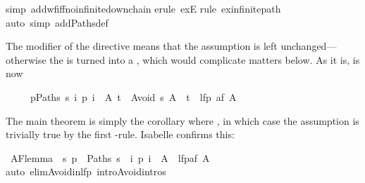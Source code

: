 \begin{isabellebody}
simp\ add{\isacharcolon}wf{\isacharunderscore}iff{\isacharunderscore}no{\isacharunderscore}infinite{\isacharunderscore}down{\isacharunderscore}chain{\isacharparenright}\isanewline
{}erule\ exE{\isacharparenright}\isanewline
{}rule\ ex{\isacharunderscore}infinite{\isacharunderscore}path{\isacharparenright}\isanewline
{}auto\ simp\ add{\isacharcolon}Paths{\isacharunderscore}def{\isacharparenright}\isanewline
{}%
\begin{isamarkuptext}%
The  modifier of the  directive means
that the assumption is left unchanged---otherwise the  is turned
into a , which would complicate matters below. As it is,
 is now
\begin{isabelle}%
\ \ \ \ \ {\isasymlbrakk}{\isasymforall}p{\isasymin}Paths\ s{\isachardot}\ {\isasymexists}i{\isachardot}\ p\ i\ {\isasymin}\ A{\isacharsemicolon}\ t\ {\isasymin}\ Avoid\ s\ A{\isasymrbrakk}\ {\isasymLongrightarrow}\ t\ {\isasymin}\ lfp\ {\isacharparenleft}af\ A{\isacharparenright}%
\end{isabelle}
The main theorem is simply the corollary where ,
in which case the assumption  is trivially true
by the first -rule. Isabelle confirms this:%
\end{isamarkuptext}%
\ AF{\isacharunderscore}lemma{}{\isacharcolon}\ \ {\isachardoublequote}{\isacharbraceleft}s{\isachardot}\ {\isasymforall}p\ {\isasymin}\ Paths\ s{\isachardot}\ {\isasymexists}\ i{\isachardot}\ p\ i\ {\isasymin}\ A{\isacharbraceright}\ {\isasymsubseteq}\ lfp{\isacharparenleft}af\ A{\isacharparenright}{\isachardoublequote}\isanewline
{}auto\ elim{\isacharcolon}Avoid{\isacharunderscore}in{\isacharunderscore}lfp\ intro{\isacharcolon}Avoid{\isachardot}intros{\isacharparenright}\isanewline
\isanewline
\end{isabellebody}%
